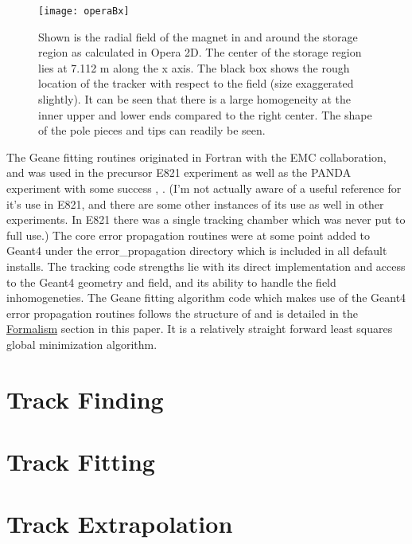 \begin{figure}[]
\caption[Horizontal magnetic field from Opera2D]{Shown is the radial field of the \gmtwo magnet in and around the storage region as calculated in Opera 2D. The center of the storage region lies at 7.112 m along the x axis. The black box shows the rough location of the tracker with respect to the field (size exaggerated slightly). It can be seen that there is a large homogeneity at the inner upper and lower ends compared to the right center. The shape of the pole pieces and tips can readily be seen.}
\centering
\texttt{[image: operaBx]}
\label{fig:operaBx}
\end{figure}

  The Geane fitting routines originated in Fortran with the EMC collaboration, and was used in the precursor E821 experiment as well as the PANDA experiment with some success \cite{geanemanual}, \cite{Lavezzi}. (I'm not actually aware of a useful reference for it's use in E821, and there are some other instances of its use as well in other experiments. In E821 there was a single tracking chamber which was never put to full use.) The core error propagation routines were at some point added to Geant4 under the error\_propagation directory which is included in all default installs. The tracking code strengths lie with its direct implementation and access to the Geant4 geometry and field, and its ability to handle the field inhomogeneties. The Geane fitting algorithm code which makes use of the Geant4 error propagation routines follows the structure of \cite{geanemanual} and is detailed in the \hyperref[sec:Formalism]{Formalism} section in this paper. It is a relatively straight forward least squares global \chisq minimization algorithm. 




\section{Track Finding}
\label{sec:Track Finding}

\section{Track Fitting}
\label{sec:Track Fitting}

\section{Track Extrapolation}
\label{sec:Track Extrapolation}
